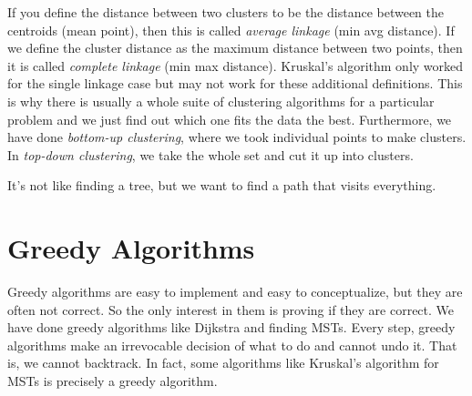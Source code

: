 \documentclass{article}
\begin{document}
      If you define the distance between two clusters to be the distance between the centroids (mean point), then this is called \textit{average linkage} (min avg distance). If we define the cluster distance as the maximum distance between two points, then it is called \textit{complete linkage} (min max distance). Kruskal's algorithm only worked for the single linkage case but may not work for these additional definitions. This is why there is usually a whole suite of clustering algorithms for a particular problem and we just find out which one fits the data the best. Furthermore, we have done \textit{bottom-up clustering}, where we took individual points to make clusters. In \textit{top-down clustering}, we take the whole set and cut it up into clusters.  

      \begin{algo}
        It's not like finding a tree, but we want to find a path that visits everything. 
        
        \begin{algorithm}[H]
          \caption{}
          \label{alg:tsp}
          \begin{algorithmic}[1]
            \Require{}
            \State 
            \EndFunction
          \end{algorithmic}
        \end{algorithm}
      \end{algo}

\section{Greedy Algorithms}

  Greedy algorithms are easy to implement and easy to conceptualize, but they are often not correct. So the only interest in them is proving if they are correct. We have done greedy algorithms like Dijkstra and finding MSTs. Every step, greedy algorithms make an irrevocable decision of what to do and cannot undo it. That is, we cannot backtrack. In fact, some algorithms like Kruskal's algorithm for MSTs is precisely a greedy algorithm. 
  
\end{document}
